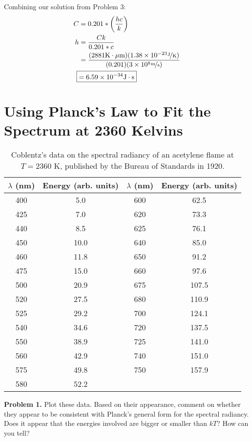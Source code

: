 \documentclass{article}
\begin{document}
Combining our solution from Problem 3:
\begin{equation*}
\begin{aligned}
C &= 0.201*\left(\frac{hc}{k}\right) \\
h &= \frac{Ck}{0.201*c} \\
&= \frac{(2881 \text{K}\cdot\mu\text{m})(1.38\times10^{-23}\nicefrac{\text{J}}{\text{K}})}{(0.201)(3\times 10^8 \nicefrac{\text{m}}{\text{s}})} \\
\Aboxed{&= 6.59\times10^{-34} \text{J}\cdot\text{s}}
\end{aligned}
\end{equation*}

\section{Using Planck's Law to Fit the Spectrum at 2360 Kelvins}

\begin{table}[H]
	\centering
	\begin{tabular}{cc|cc}
		\toprule
		$\lambda$ (nm) & Energy (arb. units) & $\lambda$ (nm) & Energy (arb. units)\\
		\midrule
		400 & \phantom{5}5.0 & 600 & \phantom{1}62.5 \\
		425 & \phantom{5}7.0 & 620 & \phantom{1}73.3 \\
		440 & \phantom{5}8.5 & 625 & \phantom{1}76.1 \\
		450 & 10.0 & 640 & \phantom{1}85.0 \\
		460 & 11.8 & 650 & \phantom{1}91.2 \\
		475 & 15.0 & 660 & \phantom{1}97.6 \\
		500 & 20.9 & 675 & 107.5 \\
		520 & 27.5 & 680 & 110.9 \\
		525 & 29.2 & 700 & 124.1 \\
		540 & 34.6 & 720 & 137.5 \\
		550 & 38.9 & 725 & 141.0 \\
		560 & 42.9 & 740 & 151.0 \\
		575 & 49.8 & 750 & 157.9 \\
		580 & 52.2 &  	 & \\
		\bottomrule
	\end{tabular}
	\caption{Coblentz's data on the spectral radiancy of an acetylene flame at $T = 2360$ K, published by the Bureau of Standards in 1920.}
\end{table}

\textbf{Problem 1.} Plot these data. Based on their appearance, comment on whether they appear to be consistent with Planck's general form for the spectral radiancy. Does it appear that the energies involved are bigger or smaller than $kT$? How can you tell?
\end{document}
